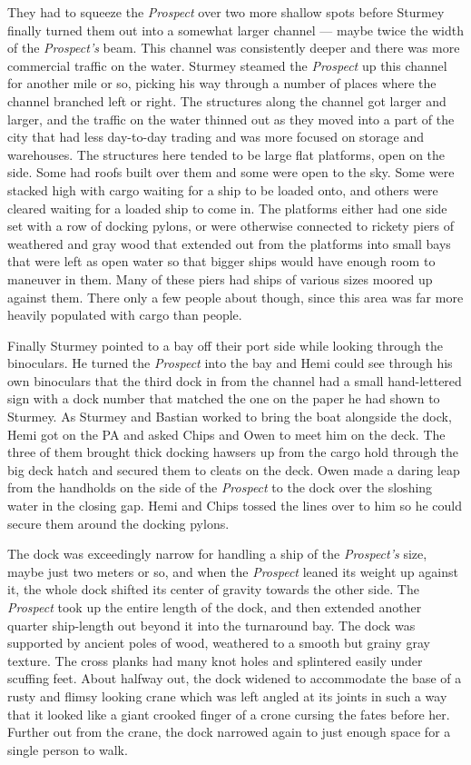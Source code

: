 \documentclass[
]{scrbook}
\begin{document}
They had to squeeze the \emph{Prospect} over two more shallow spots
before Sturmey finally turned them out into a somewhat larger channel
--- maybe twice the width of the \emph{Prospect's} beam. This channel
was consistently deeper and there was more commercial traffic on the
water. Sturmey steamed the \emph{Prospect} up this channel for another
mile or so, picking his way through a number of places where the channel
branched left or right. The structures along the channel got larger and
larger, and the traffic on the water thinned out as they moved into a
part of the city that had less day-to-day trading and was more focused
on storage and warehouses. The structures here tended to be large flat
platforms, open on the side. Some had roofs built over them and some
were open to the sky. Some were stacked high with cargo waiting for a
ship to be loaded onto, and others were cleared waiting for a loaded
ship to come in. The platforms either had one side set with a row of
docking pylons, or were otherwise connected to rickety piers of
weathered and gray wood that extended out from the platforms into small
bays that were left as open water so that bigger ships would have enough
room to maneuver in them. Many of these piers had ships of various sizes
moored up against them. There only a few people about though, since this
area was far more heavily populated with cargo than people.

Finally Sturmey pointed to a bay off their port side while looking
through the binoculars. He turned the \emph{Prospect} into the bay and
Hemi could see through his own binoculars that the third dock in from
the channel had a small hand-lettered sign with a dock number that
matched the one on the paper he had shown to Sturmey. As Sturmey and
Bastian worked to bring the boat alongside the dock, Hemi got on the PA
and asked Chips and Owen to meet him on the deck. The three of them
brought thick docking hawsers up from the cargo hold through the big
deck hatch and secured them to cleats on the deck. Owen made a daring
leap from the handholds on the side of the \emph{Prospect} to the dock
over the sloshing water in the closing gap. Hemi and Chips tossed the
lines over to him so he could secure them around the docking pylons.

The dock was exceedingly narrow for handling a ship of the
\emph{Prospect's} size, maybe just two meters or so, and when the
\emph{Prospect} leaned its weight up against it, the whole dock shifted
its center of gravity towards the other side. The \emph{Prospect} took
up the entire length of the dock, and then extended another quarter
ship-length out beyond it into the turnaround bay. The dock was
supported by ancient poles of wood, weathered to a smooth but grainy
gray texture. The cross planks had many knot holes and splintered easily
under scuffing feet. About halfway out, the dock widened to accommodate
the base of a rusty and flimsy looking crane which was left angled at
its joints in such a way that it looked like a giant crooked finger of a
crone cursing the fates before her. Further out from the crane, the dock
narrowed again to just enough space for a single person to walk.
\end{document}
